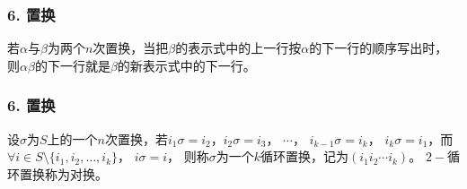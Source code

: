 \documentclass{beamer}
\begin{document}
\begin{CJK*}{UTF8}{gbsn}
 \begin{frame}
  \frametitle{6. 置换} 
  若$\alpha$与$\beta$为两个$n$次置换，当把$\beta$的表示式中的上一行按$\alpha$的下一行的顺序写出时，则$\alpha \beta$的下一行就是$\beta$的新表示式中的下一行。
 \end{frame}
 \begin{frame}
   \frametitle{6. 置换}
   \begin{Def}\justifying\let\raggedright\justifying
     设$\sigma$为$S$上的一个$n$次置换，若$i_1\sigma=i_2$，$i_2\sigma = i_3$， $\cdots$， $i_{k-1}\sigma = i_k$， $i_k\sigma = i_1$，而$\forall i \in S\setminus \{i_1, i_2, \ldots, i_k\}$， $i\sigma = i$，
     则称$\sigma$为一个\alert{$k$循环置换}，记为$(i_1i_2\cdots i_k)$。 $2-$循环置换称为\alert{对换}。
   \end{Def}
 \end{frame}


\end{CJK*}
\end{document}
